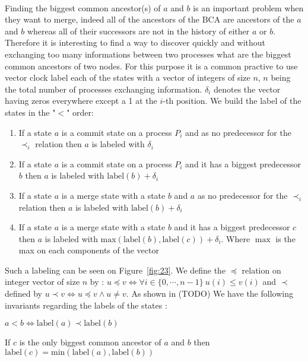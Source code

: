 \paragraph{} Finding the biggest common ancestor(s) of $a$ and $b$ is an important problem when they want to merge, indeed all of the ancestors of the BCA are ancestors of the $a$ and $b$ whereas all of their successors are not in the history of either $a$ or $b$. Therefore it is interesting to find a way to discover quickly and without exchanging too many informations between two processes what are the biggest common ancestors of two nodes. For this purpose it is a common practive to use vector clock label each of the states with a vector of integers of size $n$, $n$ being the total number of processes exchanging information. $\delta_i$ denotes the vector having zeros everywhere except a 1 at the $i$-th position. We build the label of the states in the "$<$" order:
\begin{enumerate}
 \item If a state $a$ is a commit state on a process $P_i$ and as no predecessor for the $\prec_i$ relation then $a$ is labeled with $\delta_i$
 \item If a state $a$ is a commit state on a process $P_i$ and it has a biggest predecessor $b$ then $a$ is labeled with $\mathrm{label}(b) + \delta_i$
 \item If a state $a$ is a merge state with a state $b$ and $a$ as no predecessor for the $\prec_i$ relation then $a$ is labeled with $\mathrm{label}(b) + \delta_i$
 \item If a state $a$ is a merge state with a state $b$ and it has a biggest predecessor $c$ then $a$ is labeled with $\mathrm{max}(\mathrm{label}(b),\mathrm{label}(c)) + \delta_i$. Where $\max$ is the max on each components of the vector
\end{enumerate}
Such a labeling can be seen on Figure~\ref{fig:23}. We define the $\preccurlyeq$ relation on integer vector of size $n$ by : $u \preccurlyeq v \Leftrightarrow \forall i \in \{0,\cdots,n-1\}\  u(i) \leq v(i)$ and $\prec$ defined by $u \prec v \Leftrightarrow u \preccurlyeq v \wedge u \neq v$. As shown in (TODO) We have the following invariants regarding the labels of the states :
\begin{proposition}
  \label{prop1}
 $ a < b \Leftrightarrow \mathrm{label}(a) \prec  \mathrm{label}(b)$
\end{proposition}
\begin{proposition}
  \label{propmin}
 If $c$ is the only biggest common ancestor of $a$ and $b$ then $\mathrm{label}(c) = \mathrm{min}(\mathrm{label}(a),\mathrm{label}(b))$
\end{proposition}

